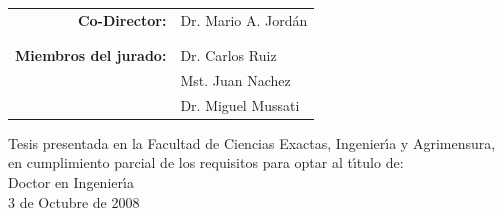 \begin{titlepage}
\begin{flushright}
\begin{tabular}{rl}
\large \textbf{Co-Director:}& Dr. Mario A. Jord{\'a}n\\
&\\
&\\
\large \textbf{Miembros del jurado:}& Dr. Carlos Ruiz\\
                                    & Mst. Juan Nachez\\
                                    & Dr. Miguel Mussati\\
\end{tabular}
\end{flushright}
\vspace{1cm}
\begin{center}
\large Tesis presentada en la Facultad de Ciencias Exactas, Ingenier{\'\i}a y Agrimensura, en cumplimiento
parcial de los requisitos para optar al t{\'\i}tulo de:\\
\vspace{1cm} \huge Doctor en Ingenier{\'\i}a\\
\vspace{1cm} \normalsize 3 de Octubre de 2008
\end{center}
\end{titlepage}
